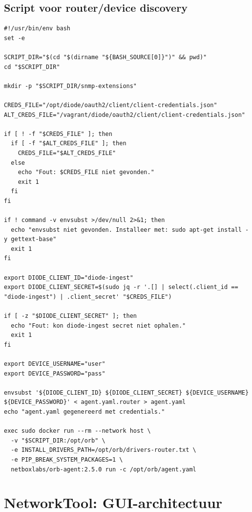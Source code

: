 \subsection{Script voor router/device discovery}

\begin{listing}[H]
  \caption[Shellscript voor router-discovery uitrol]{Volledig shellscript voor het genereren van \texttt{agent.yaml} voor router/device discovery (\S\ref{sec:schaalbaarheid})}
  \label{lst:orb-router-script}
  \begin{verbatim}
#!/usr/bin/env bash
set -e

SCRIPT_DIR="$(cd "$(dirname "${BASH_SOURCE[0]}")" && pwd)"
cd "$SCRIPT_DIR"

mkdir -p "$SCRIPT_DIR/snmp-extensions"

CREDS_FILE="/opt/diode/oauth2/client/client-credentials.json"
ALT_CREDS_FILE="/vagrant/diode/oauth2/client/client-credentials.json"

if [ ! -f "$CREDS_FILE" ]; then
  if [ -f "$ALT_CREDS_FILE" ]; then
    CREDS_FILE="$ALT_CREDS_FILE"
  else
    echo "Fout: $CREDS_FILE niet gevonden."
    exit 1
  fi
fi

if ! command -v envsubst >/dev/null 2>&1; then
  echo "envsubst niet gevonden. Installeer met: sudo apt-get install -y gettext-base"
  exit 1
fi

export DIODE_CLIENT_ID="diode-ingest"
export DIODE_CLIENT_SECRET=$(sudo jq -r '.[] | select(.client_id == "diode-ingest") | .client_secret' "$CREDS_FILE")

if [ -z "$DIODE_CLIENT_SECRET" ]; then
  echo "Fout: kon diode-ingest secret niet ophalen."
  exit 1
fi

export DEVICE_USERNAME="user"
export DEVICE_PASSWORD="pass"

envsubst '${DIODE_CLIENT_ID} ${DIODE_CLIENT_SECRET} ${DEVICE_USERNAME} ${DEVICE_PASSWORD}' < agent.yaml.router > agent.yaml
echo "agent.yaml gegenereerd met credentials."

exec sudo docker run --rm --network host \
  -v "$SCRIPT_DIR:/opt/orb" \
  -e INSTALL_DRIVERS_PATH=/opt/orb/drivers-router.txt \
  -e PIP_BREAK_SYSTEM_PACKAGES=1 \
  netboxlabs/orb-agent:2.5.0 run -c /opt/orb/agent.yaml
  \end{verbatim}
\end{listing}

\section{NetworkTool: GUI-architectuur}
\label{sec:bijlage-networktool-gui}

